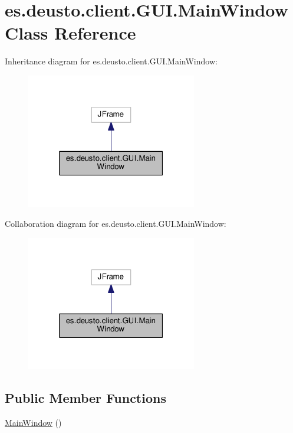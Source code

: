 \hypertarget{classes_1_1deusto_1_1client_1_1_g_u_i_1_1_main_window}{}\section{es.\+deusto.\+client.\+G\+U\+I.\+Main\+Window Class Reference}
\label{classes_1_1deusto_1_1client_1_1_g_u_i_1_1_main_window}


Inheritance diagram for es.\+deusto.\+client.\+G\+U\+I.\+Main\+Window\+:
\nopagebreak
\begin{figure}[H]
\begin{center}
\leavevmode
\includegraphics[width=211pt]{classes_1_1deusto_1_1client_1_1_g_u_i_1_1_main_window__inherit__graph}
\end{center}
\end{figure}


Collaboration diagram for es.\+deusto.\+client.\+G\+U\+I.\+Main\+Window\+:
\nopagebreak
\begin{figure}[H]
\begin{center}
\leavevmode
\includegraphics[width=211pt]{classes_1_1deusto_1_1client_1_1_g_u_i_1_1_main_window__coll__graph}
\end{center}
\end{figure}
\subsection*{Public Member Functions}
\begin{DoxyCompactItemize}
\item 
\hyperlink{classes_1_1deusto_1_1client_1_1_g_u_i_1_1_main_window_a471b4c0c749b9f22c1c74f85a410c1c9}{Main\+Window} ()
\end{DoxyCompactItemize}


